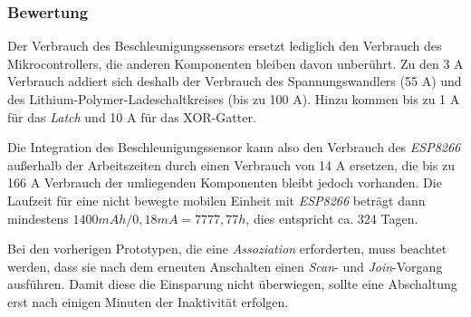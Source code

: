 \subsubsection{Bewertung}
Der Verbrauch des Beschleunigungssensors ersetzt lediglich den Verbrauch des Mikrocontrollers, die anderen Komponenten bleiben davon unberührt.
Zu den 3 \textmu A Verbrauch addiert sich deshalb der Verbrauch des Spannungswandlers (55 \textmu A) und des Lithium-Polymer-Ladeschaltkreises (bis zu 100 \textmu A).
Hinzu kommen bis zu 1 \textmu A für das \emph{Latch} und 10 \textmu A für das XOR-Gatter.

Die Integration des Beschleunigungssensor kann also den Verbrauch des \emph{ESP8266} außerhalb der Arbeitszeiten durch einen Verbrauch von 14 \textmu A ersetzen, die bis zu 166 \textmu A Verbrauch der umliegenden Komponenten bleibt jedoch vorhanden.
Die Laufzeit für eine nicht bewegte mobilen Einheit mit \emph{ESP8266} beträgt dann mindestens $1400mAh / 0,18mA = 7777,77h$, dies entspricht ca. 324 Tagen.

Bei den vorherigen Prototypen, die eine \emph{Assoziation} erforderten, muss beachtet werden, dass sie nach dem erneuten Anschalten einen \emph{Scan}- und \emph{Join}-Vorgang ausführen.
Damit diese die Einsparung nicht überwiegen, sollte eine Abschaltung erst nach einigen Minuten der Inaktivität erfolgen.


